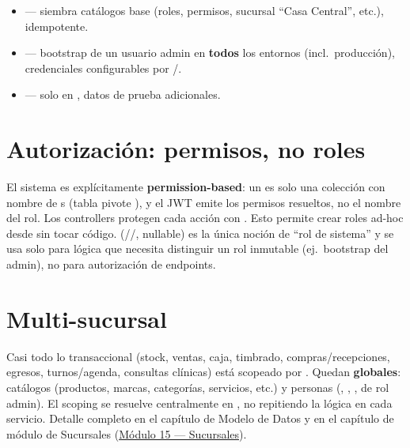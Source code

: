 \begin{enumerate}
\begin{itemize}
    \item {}\allowbreak {} --- siembra catálogos base (roles, permisos, sucursal ``Casa Central'', etc.), idempotente.
    \item {}\allowbreak {}\allowbreak {}\allowbreak {}\allowbreak \code{)} --- bootstrap de un usuario admin en \textbf{todos} los entornos (incl.\ producción), credenciales configurables por /\allowbreak {}.
    \item {}\allowbreak {}\allowbreak {}\allowbreak {}\allowbreak \code{)} --- solo en , datos de prueba adicionales.
  \end{itemize}
\end{enumerate}

\section{Autorización: permisos, no roles}
\label{sec:arch-autorizacion}

El sistema es explícitamente \textbf{permission-based}: un  es solo una colección con nombre de s (tabla pivote ), y el JWT emite los permisos resueltos, no el nombre del rol. Los controllers protegen cada acción con \code{[Authorize(Policy = "permiso_especifico")]}. Esto permite crear roles ad-hoc desde  sin tocar código.  (//, nullable) es la única noción de ``rol de sistema'' y se usa solo para lógica que necesita distinguir un rol inmutable (ej.\ bootstrap del admin), no para autorización de endpoints.

\section{Multi-sucursal}
\label{sec:arch-multisucursal}

Casi todo lo transaccional (stock, ventas, caja, timbrado, compras/recepciones, egresos, turnos/agenda, consultas clínicas) está scopeado por . Quedan \textbf{globales}: catálogos (productos, marcas, categorías, servicios, etc.) y personas (, , ,  de rol admin). El scoping se resuelve centralmente en \allowbreak {}\allowbreak {}, no repitiendo la lógica en cada servicio. Detalle completo en el capítulo de Modelo de Datos y en el capítulo de módulo de Sucursales (\hyperref[mod:15-sucursales]{Módulo 15 --- Sucursales}).

